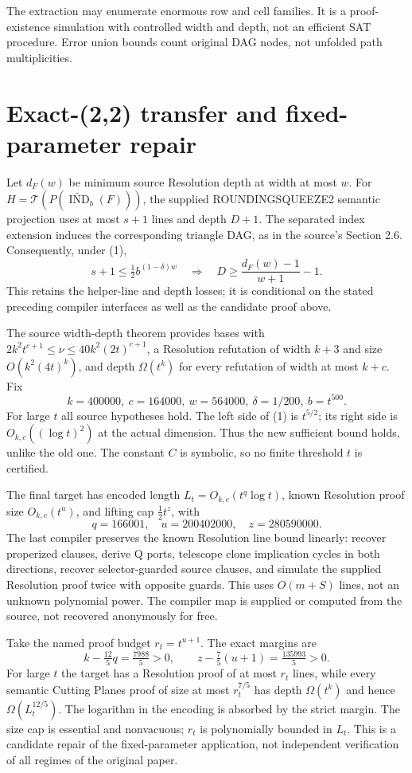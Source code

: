 \documentclass[11pt]{article}
\newcommand{\IND}{\operatorname{IND}}
\begin{document}
The extraction may enumerate enormous row and cell families. It is a
proof-existence simulation with controlled width and depth, not an efficient
SAT procedure. Error union bounds count original DAG nodes, not unfolded
path multiplicities.

\section{Exact-(2,2) transfer and fixed-parameter repair}
Let $d_F(w)$ be minimum source Resolution depth at width at most $w$.
For $H=\mathcal T(P(\widetilde{\IND}_b(F)))$, the supplied
ROUNDINGSQUEEZE2 semantic projection uses at most $s+1$ lines and depth
$D+1$. The separated index extension induces the corresponding triangle
DAG, as in the source's Section 2.6. Consequently, under (1),
\[
 s+1\le\tfrac12b^{(1-\delta)w}
 \quad\Longrightarrow\quad
 D\ge\frac{d_F(w)-1}{w+1}-1.                                \tag{5}
\]
This retains the helper-line and depth losses; it is conditional on the
stated preceding compiler interfaces as well as the candidate proof above.

The source width-depth theorem provides bases with
$2k^2t^{c+1}\le\nu\le40k^2(2t)^{c+1}$, a Resolution refutation of width
$k+3$ and size $O(k^2(4t)^k)$, and depth $\Omega(t^k)$ for every refutation
of width at most $k+c$. Fix
\[
 k=400000,\ c=164000,\ w=564000,\ \delta=1/200,\ b=t^{500}.
\]
For large $t$ all source hypotheses hold. The left side of (1) is $t^{5/2}$;
its right side is $O_{k,c}((\log t)^2)$ at the actual dimension. Thus the
new sufficient bound holds, unlike the old one. The constant $C$ is
symbolic, so no finite threshold $t$ is certified.

The final target has encoded length $L_t=O_{k,c}(t^q\log t)$, known
Resolution proof size $O_{k,c}(t^u)$, and lifting cap $\tfrac12t^z$, with
\[
 q=166001,\quad u=200402000,\quad z=280590000.
\]
The last compiler preserves the known Resolution line bound linearly:
recover properized clauses, derive Q ports, telescope clone implication
cycles in both directions, recover selector-guarded source clauses, and
simulate the supplied Resolution proof twice with opposite guards. This
uses $O(m+S)$ lines, not an unknown polynomial power. The compiler map is
supplied or computed from the source, not recovered anonymously for free.

Take the named proof budget $r_t=t^{u+1}$. The exact margins are
\[
 k-\tfrac{12}{5}q=\tfrac{7988}{5}>0,\qquad
 z-\tfrac75(u+1)=\tfrac{135993}{5}>0.
\]
For large $t$ the target has a Resolution proof of at most $r_t$ lines,
while every semantic Cutting Planes proof of size at most $r_t^{7/5}$ has
depth $\Omega(t^k)$ and hence $\Omega(L_t^{12/5})$. The logarithm in the
encoding is absorbed by the strict margin. The size cap is essential and
nonvacuous; $r_t$ is polynomially bounded in $L_t$. This is a candidate
repair of the fixed-parameter application, not independent verification of
all regimes of the original paper.
\end{document}
